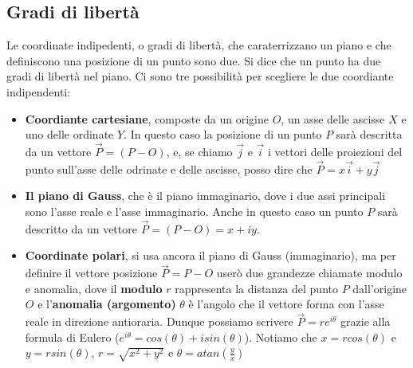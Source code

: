 \subsection{Gradi di libertà}
Le coordinate indipedenti, o gradi di libertà, che caraterrizzano un piano e che definiscono una posizione di un punto sono due. Si dice che un punto ha due gradi di libertà nel piano.\newline
Ci sono tre possibilità per scegliere le due coordiante indipendenti:
\begin{itemize}
    \item \textbf{Coordiante cartesiane}, composte da un origine $O$, un asse delle ascisse $X$ e uno delle ordinate $Y$. In questo caso la posizione di un punto $P$ sarà descritta da un vettore $\vec{P} = (P-O)$, e, se chiamo $\vec{j}$ e $\vec{i}$ i vettori delle proiezioni del punto sull'asse delle odrinate e delle ascisse, posso dire che $\vec{P} = x \vec{i} + y \vec{j}$
    \item \textbf{Il piano di Gauss}, che è il piano immaginario, dove i due assi principali sono l'asse reale e l'asse immaginario. Anche in questo caso un punto $P$ sarà descritto da un vettore $\vec{P} = (P - O) = x + iy$.
    \item \textbf{Coordinate polari}, si usa ancora il piano di Gauss (immaginario), ma per definire il vettore posizione $\vec{P} = P - O$ userò due grandezze chiamate modulo e anomalia, dove il \textbf{modulo} $r$ rappresenta la distanza del punto $P$ dall'origine $O$ e l'\textbf{anomalia (argomento)} $\theta$ è l'angolo che il vettore forma con l'asse reale in direzione antioraria. Dunque possiamo scrivere $\vec{P} = r e^{i \theta}$ grazie alla formula di Eulero ($e^{i \theta} = cos(\theta)+  i sin(\theta)$). Notiamo che $x =r cos(\theta) $ e $y = r sin(\theta)$, $r = \sqrt{x^2 + y^2}$ e $\theta = atan\left( \frac{y}{x} \right)$
\end{itemize}
